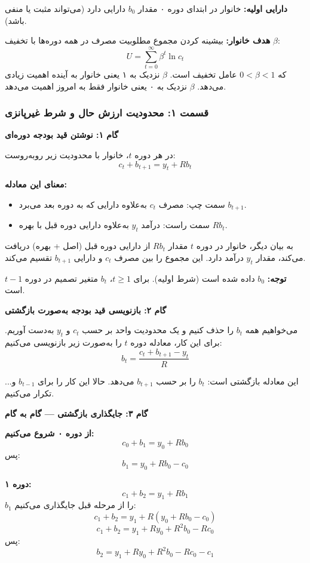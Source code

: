 \documentclass[12pt,a4paper]{article}
\begin{document}
\textbf{دارایی اولیه:} خانوار در ابتدای دوره ۰ مقدار $b_0$ دارایی دارد (می‌تواند مثبت یا منفی باشد).

\textbf{هدف خانوار:} بیشینه کردن مجموع مطلوبیت مصرف در همه دوره‌ها با تخفیف $\beta$:
\[
	U = \sum_{t=0}^{\infty} \beta^t \ln c_t
\]
که $0 < \beta < 1$ عامل تخفیف است. $\beta$ نزدیک به ۱ یعنی خانوار به آینده اهمیت زیادی می‌دهد. $\beta$ نزدیک به ۰ یعنی خانوار فقط به امروز اهمیت می‌دهد.

\subsubsection{قسمت ۱: محدودیت ارزش حال و شرط غیرپانزی}

\textbf{گام ۱: نوشتن قید بودجه دوره‌ای}

در هر دوره $t$، خانوار با محدودیت زیر روبه‌روست:
\[
	c_t + b_{t+1} = y_t + R b_t
\]

\textbf{معنای این معادله:}

\begin{itemize}
	\item سمت چپ: مصرف $c_t$ به‌علاوه دارایی که به دوره بعد می‌برد $b_{t+1}$.
	\item سمت راست: درآمد $y_t$ به‌علاوه دارایی دوره قبل با بهره $R b_t$.
\end{itemize}

به بیان دیگر، خانوار در دوره $t$ مقدار $R b_t$ از دارایی دوره قبل (اصل + بهره) دریافت می‌کند، مقدار $y_t$ درآمد دارد. این مجموع را بین مصرف $c_t$ و دارایی $b_{t+1}$ تقسیم می‌کند.

\textbf{توجه:} $b_0$ داده شده است (شرط اولیه). برای $t \geq 1$، $b_t$ متغیر تصمیم در دوره $t-1$ است.

\textbf{گام ۲: بازنویسی قید بودجه به‌صورت بازگشتی}

می‌خواهیم همه $b_t$ را حذف کنیم و یک محدودیت واحد بر حسب $c_t$ و $y_t$ به‌دست آوریم. برای این کار، معادله دوره $t$ را به‌صورت زیر بازنویسی می‌کنیم:
\[
	b_t = \frac{c_t + b_{t+1} - y_t}{R}
\]

این معادله بازگشتی است: $b_t$ را بر حسب $b_{t+1}$ می‌دهد. حالا این کار را برای $b_{t-1}$ و... تکرار می‌کنیم.

\textbf{گام ۳: جایگذاری بازگشتی — گام به گام}

\textbf{از دوره ۰ شروع می‌کنیم:}
\[
	c_0 + b_1 = y_0 + R b_0
\]
پس:
\[
	b_1 = y_0 + R b_0 - c_0
\]

\textbf{دوره ۱:}
\[
	c_1 + b_2 = y_1 + R b_1
\]
$b_1$ را از مرحله قبل جایگذاری می‌کنیم:
\[
	c_1 + b_2 = y_1 + R(y_0 + R b_0 - c_0)
\]
\[
	c_1 + b_2 = y_1 + R y_0 + R^2 b_0 - R c_0
\]
پس:
\[
	b_2 = y_1 + R y_0 + R^2 b_0 - R c_0 - c_1
\]
\end{document}
